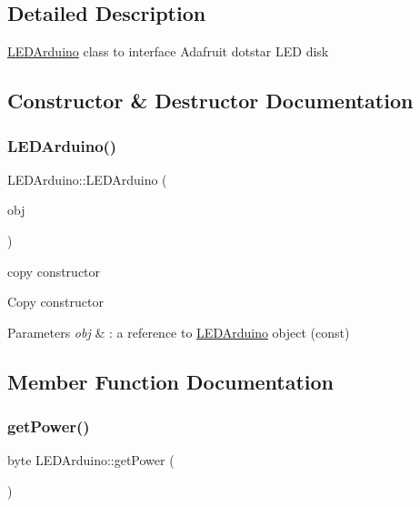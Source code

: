\subsection{Detailed Description}
\hyperlink{class_l_e_d_arduino}{L\+E\+D\+Arduino} class to interface Adafruit dotstar L\+ED disk 

\subsection{Constructor \& Destructor Documentation}
\mbox{\label{class_l_e_d_arduino_a8ba91e5ee89fe89f9c1052f5619fc436}} 
\subsubsection{\texorpdfstring{L\+E\+D\+Arduino()}{LEDArduino()}}
{\footnotesize\ttfamily L\+E\+D\+Arduino\+::\+L\+E\+D\+Arduino (\begin{DoxyParamCaption}\item[{const \hyperlink{class_l_e_d_arduino}{L\+E\+D\+Arduino} \&}]{obj }\end{DoxyParamCaption})}



copy constructor 

Copy constructor 
\begin{DoxyParams}{Parameters}
{\em obj} & \+: a reference to \hyperlink{class_l_e_d_arduino}{L\+E\+D\+Arduino} object (const) \\
\hline
\end{DoxyParams}


\subsection{Member Function Documentation}
\mbox{\label{class_l_e_d_arduino_a11aaec881a1e6e1a1f4cff814dc252ea}} 
\subsubsection{\texorpdfstring{get\+Power()}{getPower()}}
{\footnotesize\ttfamily byte L\+E\+D\+Arduino\+::get\+Power (\begin{DoxyParamCaption}{ }\end{DoxyParamCaption})}



